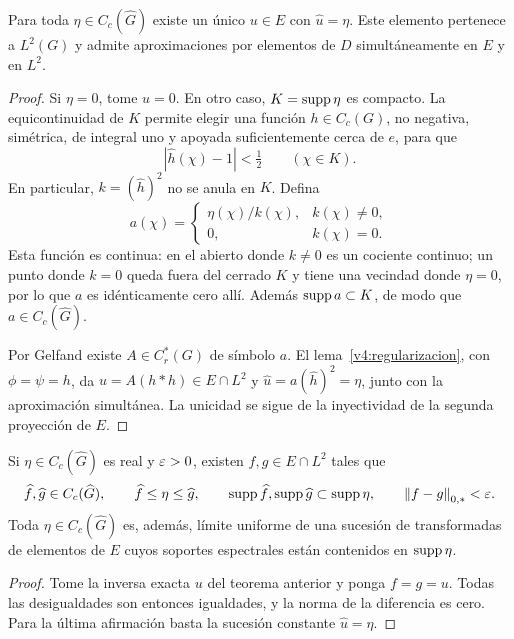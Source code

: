 \begin{teorema}\label{v4:inversa-compacta}
Para toda $\eta\in C_c(\widehat G)$ existe un único $u\in E$ con $\widehat u=\eta$. Este elemento pertenece a $L^2(G)$ y admite aproximaciones por elementos de $D$ simultáneamente en $E$ y en $L^2$.
\end{teorema}
\begin{proof}
Si $\eta=0$, tome $u=0$. En otro caso, $K=\operatorname{supp}\eta$ es compacto. La equicontinuidad de $K$ permite elegir una función $h\in C_c(G)$, no negativa, simétrica, de integral uno y apoyada suficientemente cerca de $e$, para que
\[
 |\widehat h(\chi)-1|<\tfrac12\qquad(\chi\in K).
\]
En particular, $k=(\widehat h)^2$ no se anula en $K$. Defina
\[
 a(\chi)=\begin{cases}
 \eta(\chi)/k(\chi),&k(\chi)\ne0,\\
 0,&k(\chi)=0.
 \end{cases}
\]
Esta función es continua: en el abierto donde $k\ne0$ es un cociente continuo; un punto donde $k=0$ queda fuera del cerrado $K$ y tiene una vecindad donde $\eta=0$, por lo que $a$ es idénticamente cero allí. Además $\operatorname{supp} a\subset K$, de modo que $a\in C_c(\widehat G)$.

Por Gelfand existe $A\in C_r^*(G)$ de símbolo $a$. El lema~\ref{v4:regularizacion}, con $\phi=\psi=h$, da
$u=A(h*h)\in E\cap L^2$ y
$\widehat u=a(\widehat h)^2=\eta$, junto con la aproximación simultánea. La unicidad se sigue de la inyectividad de la segunda proyección de $E$.
\end{proof}

\begin{corolario}\label{v4:aproximacion-lectura28}
Si $\eta\in C_c(\widehat G)$ es real y $\varepsilon>0$, existen $f,g\in E\cap L^2$ tales que
\[
 \widehat f,\widehat g\in C_c(\widehat G),\qquad
 \widehat f\le\eta\le\widehat g,\qquad
 \operatorname{supp}\widehat f,\operatorname{supp}\widehat g\subset\operatorname{supp}\eta,\qquad
 \left\lVert f-g\right\rVert_{0,*}<\varepsilon.
\]
Toda $\eta\in C_c(\widehat G)$ es, además, límite uniforme de una sucesión de transformadas de elementos de $E$ cuyos soportes espectrales están contenidos en $\operatorname{supp}\eta$.
\end{corolario}
\begin{proof}
Tome la inversa exacta $u$ del teorema anterior y ponga $f=g=u$. Todas las desigualdades son entonces igualdades, y la norma de la diferencia es cero. Para la última afirmación basta la sucesión constante $\widehat u=\eta$.
\end{proof}

